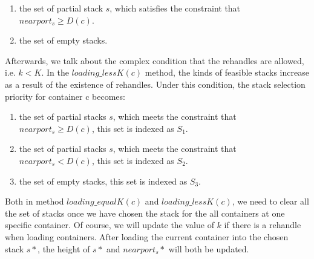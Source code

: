 \documentclass[review,3p,times,authoryear,12pt]{elsarticle}
\begin{document}
\begin{enumerate}
\item the set of partial stack $s$, which satisfies the constraint that $nearport_s \ge D(c)$.
\item the set of empty stacks.
\end{enumerate}


Afterwards, we talk about the complex condition that the rehandles are allowed, i.e. $k < K$.
In the $loading\_lessK(c)$ method, the kinds of feasible stacks increase as a result of the existence of rehandles.
Under this condition, the stack selection priority for container c becomes:

\begin{enumerate}
\item the set of partial stacks $s$, which meets the constraint that $nearport_s \ge D(c)$, this set is indexed as $S_1$.
\item the set of partial stacks $s$, which meets the constraint that $nearport_s < D(c)$, this set is indexed as $S_2$.
\item the set of empty stacks, this set is indexed as $S_3$.
\end{enumerate}


Both in method $loading\_equalK(c)$ and $loading\_lessK(c)$, we need to clear all the set of stacks once we have chosen the stack for the all containers at one specific container.
Of course, we will update the value of $k$ if there is a rehandle when loading containers.
After loading the current container into the chosen stack $s*$, the height of $s*$ and $nearport_s*$ will both be updated.
\end{document}
